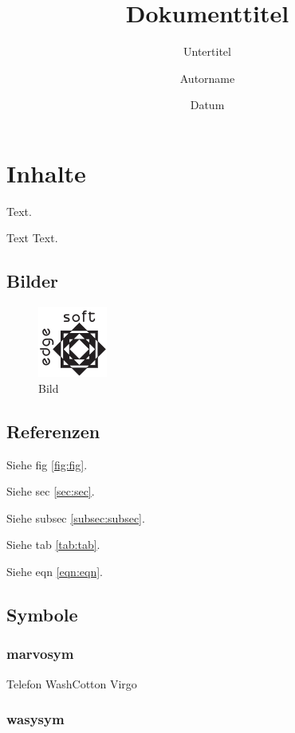 \documentclass[ngerman]{scrartcl}
\title[Kurzform]{Dokumenttitel}
\subtitle{Untertitel}
\date{Datum}
\author{Autorname}
\begin{document}
	\maketitle

	\tableofcontents
	\cleardoublepage

	\section{Inhalte}
	\label{sec:sec}

	Text.

	Text  Text.

	\subsection{Bilder}
	\label{subsec:subsec}

	\begin{figure}[htb]
		\caption{Bild}
		\label{fig:fig}
		\includegraphics{testlogo}
	\end{figure}

	\subsection{Referenzen}

	Siehe fig \autoref{fig:fig}.

	Siehe sec \autoref{sec:sec}.

	Siehe subsec \autoref{subsec:subsec}.

	Siehe tab \autoref{tab:tab}.

	Siehe eqn \autoref{eqn:eqn}.

	\subsection{Symbole}

	\subsubsection{marvosym}

	Telefon \Telefon{}
	WashCotton \WashCotton{}
	Virgo \Virgo{}

	\subsubsection{wasysym}
\end{document}
